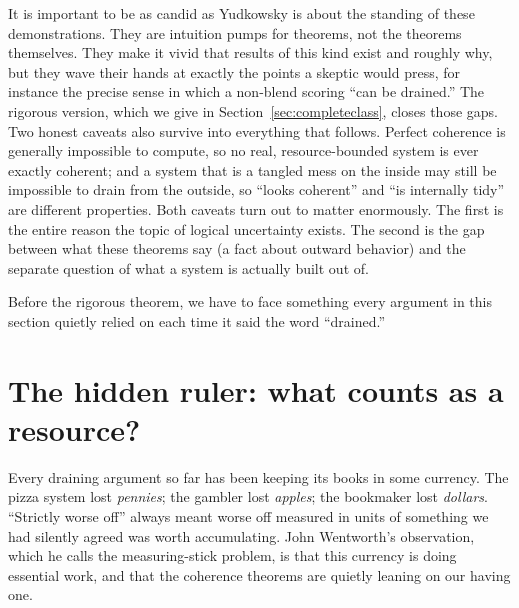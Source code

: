 \documentclass[10pt]{article}
\theoremstyle{definition}
\theoremstyle{remark}
\begin{document}
It is important to be as candid as Yudkowsky is about the standing of these demonstrations. They are intuition pumps for theorems, not the theorems themselves. They make it vivid that results of this kind exist and roughly why, but they wave their hands at exactly the points a skeptic would press, for instance the precise sense in which a non-blend scoring ``can be drained.'' The rigorous version, which we give in Section~\ref{sec:completeclass}, closes those gaps. Two honest caveats also survive into everything that follows. Perfect coherence is generally impossible to compute, so no real, resource-bounded system is ever exactly coherent; and a system that is a tangled mess on the inside may still be impossible to drain from the outside, so ``looks coherent'' and ``is internally tidy'' are different properties. Both caveats turn out to matter enormously. The first is the entire reason the topic of logical uncertainty exists. The second is the gap between what these theorems say (a fact about outward behavior) and the separate question of what a system is actually built out of.

Before the rigorous theorem, we have to face something every argument in this section quietly relied on each time it said the word ``drained.''

\section{The hidden ruler: what counts as a resource?}
\label{sec:measuringstick}

Every draining argument so far has been keeping its books in some currency. The pizza system lost \emph{pennies}; the gambler lost \emph{apples}; the bookmaker lost \emph{dollars}. ``Strictly worse off'' always meant worse off measured in units of something we had silently agreed was worth accumulating. John Wentworth's observation, which he calls the measuring-stick problem, is that this currency is doing essential work, and that the coherence theorems are quietly leaning on our having one.
\end{document}
